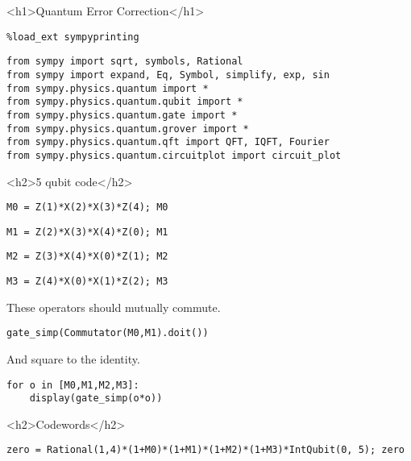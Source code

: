 <h1>Quantum Error Correction</h1>

\begin{verbatim}
%load_ext sympyprinting
\end{verbatim}

\begin{verbatim}
from sympy import sqrt, symbols, Rational
from sympy import expand, Eq, Symbol, simplify, exp, sin
from sympy.physics.quantum import *
from sympy.physics.quantum.qubit import *
from sympy.physics.quantum.gate import *
from sympy.physics.quantum.grover import *
from sympy.physics.quantum.qft import QFT, IQFT, Fourier
from sympy.physics.quantum.circuitplot import circuit_plot
\end{verbatim}

<h2>5 qubit code</h2>

\begin{verbatim}
M0 = Z(1)*X(2)*X(3)*Z(4); M0

\end{verbatim}

\begin{verbatim}
M1 = Z(2)*X(3)*X(4)*Z(0); M1

\end{verbatim}

\begin{verbatim}
M2 = Z(3)*X(4)*X(0)*Z(1); M2

\end{verbatim}

\begin{verbatim}
M3 = Z(4)*X(0)*X(1)*Z(2); M3

\end{verbatim}

These operators should mutually commute.

\begin{verbatim}
gate_simp(Commutator(M0,M1).doit())

\end{verbatim}

And square to the identity.

\begin{verbatim}
for o in [M0,M1,M2,M3]:
    display(gate_simp(o*o))

\end{verbatim}

<h2>Codewords</h2>

\begin{verbatim}
zero = Rational(1,4)*(1+M0)*(1+M1)*(1+M2)*(1+M3)*IntQubit(0, 5); zero

\end{verbatim}

